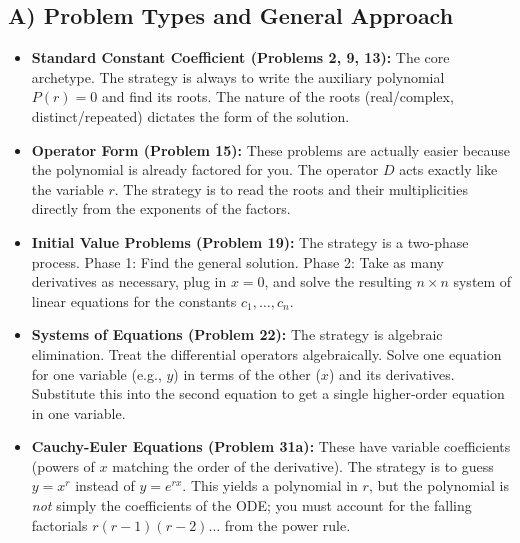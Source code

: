 \documentclass[11pt]{article}
\begin{document}
\subsection{A) Problem Types and General Approach}
\begin{itemize}
    \item \textbf{Standard Constant Coefficient (Problems 2, 9, 13):} The core archetype. The strategy is always to write the auxiliary polynomial $P(r) = 0$ and find its roots. The nature of the roots (real/complex, distinct/repeated) dictates the form of the solution.
    \item \textbf{Operator Form (Problem 15):} These problems are actually easier because the polynomial is already factored for you. The operator $D$ acts exactly like the variable $r$. The strategy is to read the roots and their multiplicities directly from the exponents of the factors.
    \item \textbf{Initial Value Problems (Problem 19):} The strategy is a two-phase process. Phase 1: Find the general solution. Phase 2: Take as many derivatives as necessary, plug in $x=0$, and solve the resulting $n \times n$ system of linear equations for the constants $c_1, \dots, c_n$.
    \item \textbf{Systems of Equations (Problem 22):} The strategy is algebraic elimination. Treat the differential operators algebraically. Solve one equation for one variable (e.g., $y$) in terms of the other ($x$) and its derivatives. Substitute this into the second equation to get a single higher-order equation in one variable.
    \item \textbf{Cauchy-Euler Equations (Problem 31a):} These have variable coefficients (powers of $x$ matching the order of the derivative). The strategy is to guess $y = x^r$ instead of $y = e^{rx}$. This yields a polynomial in $r$, but the polynomial is \textit{not} simply the coefficients of the ODE; you must account for the falling factorials $r(r-1)(r-2)\dots$ from the power rule.
\end{itemize}
\end{document}
